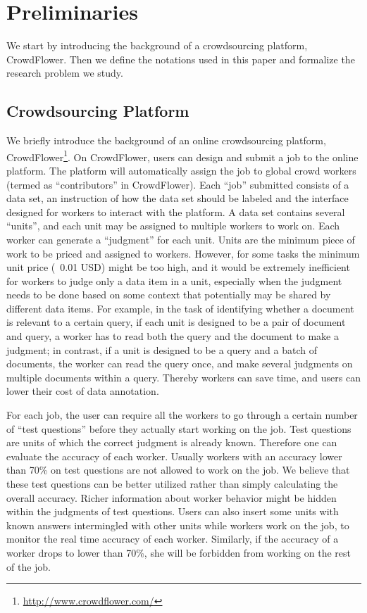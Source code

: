 \section{Preliminaries}
\label{sec:prelim}

We start by introducing the background of a crowdsourcing platform, CrowdFlower.
Then we define the notations used in this paper and formalize the research problem we study.  

\subsection{Crowdsourcing Platform}

We briefly introduce the background of an online crowdsourcing platform, CrowdFlower\footnote{\url{http://www.crowdflower.com/}}.  
On CrowdFlower, users can design and submit a job to the online platform.
The platform will automatically assign the job to global crowd workers (termed as ``contributors'' in CrowdFlower).  
Each ``job'' submitted consists of a data set, an instruction of how the data set should be labeled 
and the interface designed for workers to interact with the platform.
A data set contains several ``units'', and each unit may be assigned to multiple workers to work on.  
Each worker can generate a ``judgment'' for each unit.  
Units are the minimum piece of work to be priced and assigned to workers.  
However, for some tasks the minimum unit price (\ie~0.01 USD) might be too high,
and it would be extremely inefficient for workers to judge only a data item in a unit, 
especially when the judgment needs to be done based on some context that potentially may be shared by different data items.  
For example, in the task of identifying whether a document is relevant to a certain query,
if each unit is designed to be a pair of document and query, 
a worker has to read both the query and the document to make a judgment;
in contrast, if a unit is designed to be a query and a batch of documents, 
the worker can read the query once, and make several judgments on multiple documents within a query.  
Thereby workers can save time, 
and users can lower their cost of data annotation.  


For each job, the user can require all the workers to go through a certain number of ``test questions'' 
before they actually start working on the job.  
Test questions are units of which the correct judgment is already known.
Therefore one can evaluate the accuracy of each worker.
Usually workers with an accuracy lower than 70\% on test questions are not allowed to work on the job.  
We believe that these test questions can be better utilized rather than simply calculating the overall accuracy.  
Richer information about worker behavior might be hidden within the judgments of test questions.  
Users can also insert some units with known answers intermingled with other units while workers work on the job,
to monitor the real time accuracy of each worker.  
Similarly, if the accuracy of a worker drops to lower than 70\%, she will be forbidden from working on the rest of the job.

